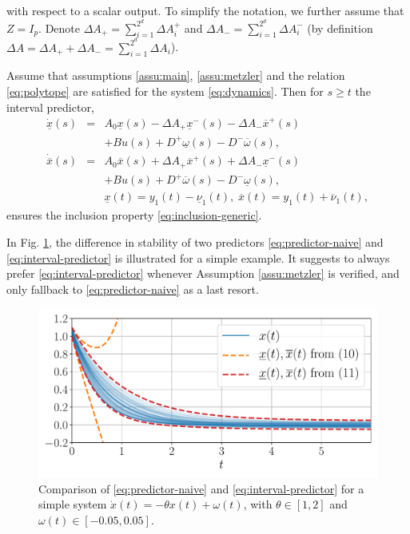 \documentclass[letterpaper, 10 pt, conference]{ieeeconf}  %
\begin{document}
with respect to a scalar output. To simplify the notation, we
further assume that $Z=I_{p}$. Denote $\Delta A_{+}=\sum_{i=1}^{2^{d}}\Delta A_{i}^{+}$
and $\Delta A_{-}=\sum_{i=1}^{2^{d}}\Delta A_{i}^{-}$ (by definition
$\Delta A=\Delta A_{+}+\Delta A_{-}=\sum_{i=1}^{2^{d}}\Delta A_{i}$).
\begin{proposition}
 \label{prop:predictor}
Assume that assumptions \ref{assu:main}, \ref{assu:metzler} and
the relation \eqref{eq:polytope} are satisfied for the system \eqref{eq:dynamics}.
Then for $s\geq t$ the interval predictor,
\begin{eqnarray}
\dot{\underline{x}}(s) & = & A_{0}\underline{x}(s)-\Delta A_{+}\underline{x}^{-}(s)-\Delta A_{-}\overline{x}^{+}(s)\nonumber \\
 &  & +Bu(s)+D^{+}\underline{\omega}(s)-D^{-}\overline{\omega}(s),\nonumber \\
\dot{\overline{x}}(s) & = & A_{0}\overline{x}(s)+\Delta A_{+}\overline{x}^{+}(s)+\Delta A_{-}\underline{x}^{-}(s)\label{eq:interval-predictor}\\
 &  & +Bu(s)+D^{+}\overline{\omega}(s)-D^{-}\underline{\omega}(s),\nonumber \\
 &  & \underline{x}(t)=y_{1}(t)-\underline{\nu}_{1}(t),\;\overline{x}(t)=y_{1}(t)+\overline{\nu}_{1}(t),\nonumber 
\end{eqnarray}
ensures the inclusion property \eqref{eq:inclusion-generic}.
\end{proposition}
In Fig. \ref{fig:predictor_example}, the difference in stability
of two predictors \eqref{eq:predictor-naive} and \eqref{eq:interval-predictor}
is illustrated for a simple example. It suggests to always prefer
\eqref{eq:interval-predictor} whenever Assumption \ref{assu:metzler}
is verified, and only fallback to \eqref{eq:predictor-naive} as a
last resort. 
\begin{figure}
\begin{centering}
\includegraphics[width=1\linewidth]{img/interval-predictor}
\par\end{centering}
\caption{\label{fig:predictor_example} Comparison of \eqref{eq:predictor-naive}
and \eqref{eq:interval-predictor} for a simple system $\dot{x}(t)=-\theta x(t)+\omega(t)$,
with $\theta\in[1,2]$ and $\omega(t)\in[-0.05,0.05]$.}
\end{figure}
\end{document}

